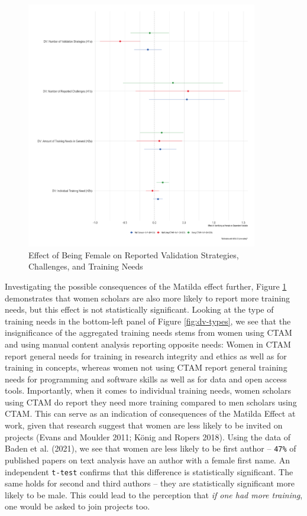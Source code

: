 \documentclass[
]{ccr}
\begin{document}
\begin{figure}[H]

{\centering \includegraphics[width=0.9\textwidth,height=\textheight]{figures/h-pre-reg-1.png}

}

\caption{\label{fig:pre-reg-h}Effect of Being Female on Reported
Validation Strategies, Challenges, and Training Needs}

\end{figure}

Investigating the possible consequences of the Matilda effect further,
Figure \ref{fig:pre-reg-h} demonstrates that women scholars are also
more likely to report more training needs, but this effect is not
statistically significant. Looking at the type of training needs in the
bottom-left panel of Figure \ref{fig:dv-types}, we see that the
insignificance of the aggregated training needs stems from women using
CTAM and using manual content analysis reporting opposite needs: Women
in CTAM report general needs for training in research integrity and
ethics as well as for training in concepts, whereas women not using CTAM
report general training needs for programming and software skills as
well as for data and open access tools. Importantly, when it comes to
individual training needs, women scholars using CTAM do report they need
more training compared to men scholars using CTAM. This can serve as an
indication of consequences of the Matilda Effect at work, given that
research suggest that women are less likely to be invited on projects
(Evans and Moulder 2011; König and Ropers 2018). Using the data of Baden
et al. (2021), we see that women are less likely to be first author --
\texttt{47\%} of published papers on text analysis have an author with a
female first name. An independent \texttt{t-test} confirms that this
difference is statistically significant. The same holds for second and
third authors -- they are statistically significant more likely to be
male. This could lead to the perception that \emph{if one had more
training}, one would be asked to join projects too.
\end{document}
